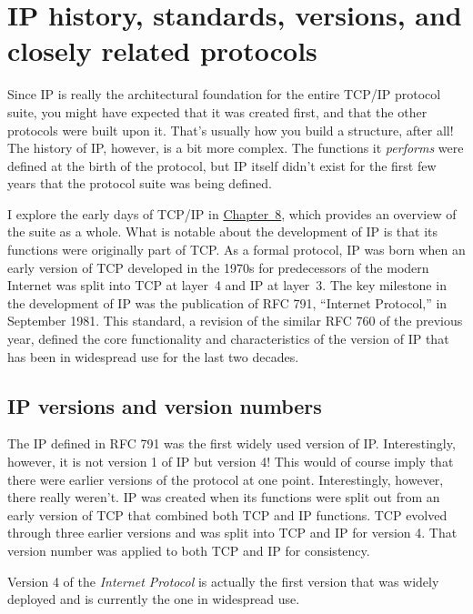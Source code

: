 \section{IP history, standards, versions, and closely related protocols}

Since IP is really the architectural foundation for the entire TCP/IP
protocol suite, you might have expected that it was created first, and
that the other protocols were built upon it. That's usually how you
build a structure, after all! The history of IP, however, is a bit more
complex. The functions it {\emph{performs}} were defined at the birth of
the protocol, but IP itself didn't exist for the first few years that
the protocol suite was being
defined.

I explore the early days of TCP/IP in \protect\hyperlink{ch08.html}{Chapter~8}, which provides an overview of the suite as a whole.
What is notable about the development of IP is that its functions were originally part of TCP.
As a formal protocol, IP was born when an early version of TCP developed in the 1970s for predecessors of the modern Internet was split into TCP at layer~4 and IP at layer~3.
The key milestone in the development of IP was the publication of RFC 791, ``Internet Protocol,'' in September 1981.
This standard, a revision of the similar RFC 760 of the previous year, defined the core functionality and characteristics of the version of IP that has been in widespread use for the last two decades.



\subsection{IP versions and version numbers}

The IP defined in RFC 791 was the first widely used version of IP.
Interestingly, however, it is not version 1 of IP but version 4! This would of course imply that there were earlier versions of the protocol at one point.
Interestingly, however, there really weren't.
IP was created when its functions were split out from an early version of TCP that combined both TCP and IP functions.
TCP evolved through three earlier versions and was split into TCP and IP for version 4.
That version number was applied to both TCP and IP for consistency.

\begin{keyconcept}
Version 4 of the \emph{Internet Protocol} is actually the first version that was widely deployed and is currently the one in widespread use.
\end{keyconcept}

